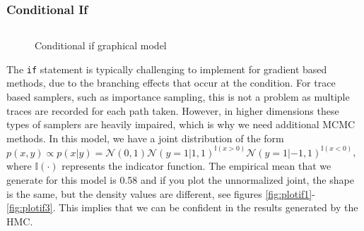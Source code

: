 \documentclass[twoside]{article}
\begin{document}
\subsubsection{Conditional If}
\inputminted{clojure}{code/conditionalif.clj}
\begin{figure}[ht]
	\begin{center}
		
	\end{center}
	\caption{Conditional if graphical model}
\end{figure}
The \texttt{if} statement is typically challenging to implement for gradient based methods, due to the branching effects that occur at the condition. For trace based samplers, such as importance sampling, this is not a problem as multiple traces are recorded for each path taken. However, in higher dimensions these types of samplers are heavily impaired, which is why we need additional MCMC methods. In this model, we have a joint distribution of the form $p(x,y) \propto p(x|y) = \mathcal{N}(0,1)\mathcal{N}(y = 1|1,1)^{\mathbb{I}(x > 0)}\mathcal{N}(y = 1|-1,1)^{\mathbb{I}(x < 0)}$, where $\mathbb{I}(\cdot)$ represents the indicator function. The empirical mean that we generate for this model is 0.58 and if you plot the unnormalized joint, the shape is the same, but the density values are different, see figures \ref{fig:plotif1}-\ref{fig:plotif3}. This implies that we can be confident in the results generated by the HMC.
\end{document}
